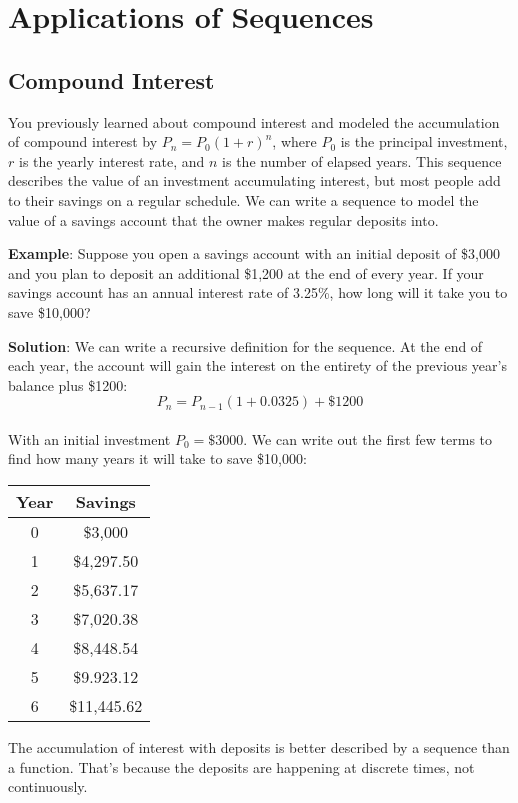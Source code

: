 \section{Applications of Sequences}
\subsection{Compound Interest}
You previously learned about compound interest and modeled the accumulation of 
compound interest by $P_n = P_0(1 + r)^n$, where $P_0$ is the principal 
investment, $r$ is the yearly interest rate, and $n$ is the number of elapsed 
years. This sequence describes the value of an investment accumulating 
interest, but most people add to their savings on a regular schedule. We can 
write a sequence to model the value of a savings account that the owner makes 
regular deposits into. 

\textbf{Example}: Suppose you open a savings account with an initial deposit 
of \$3,000 and you plan to deposit an additional \$1,200 at the end of every 
year. If your savings account has an annual interest rate of 3.25\%, how long 
will it take you to save \$10,000?

\textbf{Solution}: We can write a recursive definition for the sequence. At 
the end of each year, the account will gain the interest on the entirety of 
the previous year's balance plus \$1200:
$$P_n = P_{n-1}(1+0.0325) + \$1200$$\\
With an initial investment $P_0 = \$3000$. We can write out the first few terms 
to find how many years it will take to save \$10,000:
\begin{center}
\begin{tabular}{|c|c|}\hline
Year & Savings\\
\hline
0 & \$3,000\\
\hline
1 & \$4,297.50\\
\hline
2 & \$5,637.17\\
\hline
3 & \$7,020.38\\
\hline
4 & \$8,448.54\\
\hline
5 & \$9.923.12\\
\hline
6 & \$11,445.62\\
\hline
\end{tabular}
\end{center}

The accumulation of interest with deposits is better described by a sequence than a function. That's because the deposits are happening at discrete times, not continuously. 

